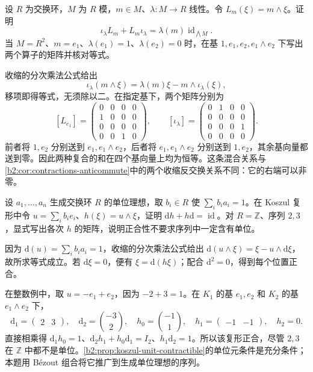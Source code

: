 \begin{exercise}\label{b2:ex:09-contractions-anticommute}
	设 \(R\) 为交换环，\(M\) 为 \(R\) 模，\(m\in M\)、\(\lambda:M\to R\) 线性。令 \(L_m(\xi)=m\wedge\xi\)。证明
	\[
		\iota_\lambda L_m+L_m\iota_\lambda=\lambda(m)\operatorname{id}_{\bigwedge M}.
	\]
	当 \(M=R^2\)、\(m=e_1\)、\(\lambda(e_1)=1\)、\(\lambda(e_2)=0\) 时，在基 \(1,e_1,e_2,e_1\wedge e_2\) 下写出两个算子的矩阵并核对等式。
\end{exercise}
\begin{solution}
	收缩的分次乘法公式给出
	\[
		\iota_\lambda(m\wedge\xi)=\lambda(m)\xi-m\wedge\iota_\lambda(\xi),
	\]
	移项即得等式，无须除以二。在指定基下，两个矩阵分别为
	\[
		[L_{e_1}]=\begin{pmatrix}0&0&0&0\\1&0&0&0\\0&0&0&0\\0&0&1&0\end{pmatrix},\qquad
		[\iota_\lambda]=\begin{pmatrix}0&1&0&0\\0&0&0&0\\0&0&0&1\\0&0&0&0\end{pmatrix}.
	\]
	前者将 \(1,e_2\) 分别送到 \(e_1,e_1\wedge e_2\)，后者将 \(e_1,e_1\wedge e_2\) 分别送到 \(1,e_2\)，其余基向量都送到零。因此两种复合的和在四个基向量上均为恒等。这条混合关系与\cref{b2:cor:contractions-anticommute}中的两个收缩反交换关系不同：它的右端可以非零。
\end{solution}

\begin{exercise}\label{b2:ex:09-koszul-unit}
	设 \(a_1,\ldots,a_n\) 生成交换环 \(R\) 的单位理想，取 \(b_i\in R\) 使 \(\sum_i b_i a_i=1\)。在 Koszul 复形中令 \(u=\sum_i b_ie_i\)、\(h(\xi)=u\wedge\xi\)，证明 \(\mathrm{d}h+h\mathrm{d}=\operatorname{id}\)。对 \(R=\mathbb Z\)、序列 \(2,3\)，显式写出各次 \(h\) 的矩阵，说明正合性不要求序列中一定含有单位。
\end{exercise}
\begin{solution}
	因为 \(\mathrm{d}(u)=\sum_i b_i a_i=1\)，收缩的分次乘法公式给出 \(\mathrm{d}(u\wedge\xi)=\xi-u\wedge\mathrm{d}\xi\)，故所求等式成立。若 \(\mathrm{d}\xi=0\)，便有 \(\xi=\mathrm{d}(h\xi)\)；配合 \(\mathrm{d}^2=0\)，得到每个位置正合。

	在整数例中，取 \(u=-e_1+e_2\)，因为 \(-2+3=1\)。在 \(K_1\) 的基 \(e_1,e_2\) 和 \(K_2\) 的基 \(e_1\wedge e_2\) 下，
	\[
		\mathrm{d}_1=\begin{pmatrix}2&3\end{pmatrix},\quad
		\mathrm{d}_2=\binom{-3}{2},\quad
		h_0=\binom{-1}{1},\quad h_1=\begin{pmatrix}-1&-1\end{pmatrix},\quad h_2=0.
	\]
	直接相乘得 \(\mathrm{d}_1h_0=1\)、\(\mathrm{d}_2h_1+h_0\mathrm{d}_1=I_2\)、\(h_1\mathrm{d}_2=1\)。所以该复形正合，尽管 \(2,3\) 在 \(\mathbb Z\) 中都不是单位。\cref{b2:prop:koszul-unit-contractible}的单位元条件是充分条件；本题用 Bézout 组合将它推广到生成单位理想的序列。
\end{solution}

